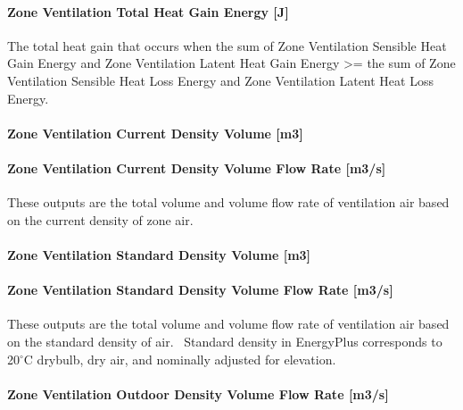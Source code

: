 \paragraph{Zone Ventilation Total Heat Gain Energy {[}J{]}}\label{zone-ventilation-total-heat-gain-energy-j}

The total heat gain that occurs when the sum of Zone Ventilation Sensible Heat Gain Energy and Zone Ventilation Latent Heat Gain Energy \textgreater{}= the sum of Zone Ventilation Sensible Heat Loss Energy and Zone Ventilation Latent Heat Loss Energy.

\paragraph{Zone Ventilation Current Density Volume {[}m3{]}}\label{zone-ventilation-current-density-volume-m3}

\paragraph{Zone Ventilation Current Density Volume Flow Rate {[}m3/s{]}}\label{zone-ventilation-current-density-volume-flow-rate-m3s}

These outputs are the total volume and volume flow rate of ventilation air based on the current density of zone air.

\paragraph{Zone Ventilation Standard Density Volume {[}m3{]}}\label{zone-ventilation-standard-density-volume-m3}

\paragraph{Zone Ventilation Standard Density Volume Flow Rate {[}m3/s{]}}\label{zone-ventilation-standard-density-volume-flow-rate-m3s}

These outputs are the total volume and volume flow rate of ventilation air based on the standard density of air.~ Standard density in EnergyPlus corresponds to 20$^\circ$C drybulb, dry air, and nominally adjusted for elevation.

\paragraph{Zone Ventilation Outdoor Density Volume Flow Rate {[}m3/s{]}}\label{zone-ventilation-outdoor-density-volume-flow-rate-m3s}


